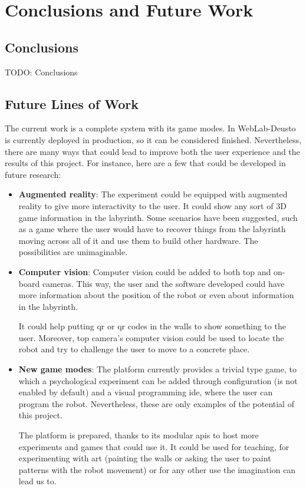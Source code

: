 \chapter{Conclusions and Future Work}

\section{Conclusions}

TODO: Conclusions

\section{Future Lines of Work}

The current work is a complete system with its game modes. In WebLab-Deusto is currently deployed in
production, so it can be considered finished. Nevertheless, there are many ways that could lead to
improve both the user experience and the results of this project. For instance, here are a few that
could be developed in future research:

\begin{itemize}

\item \textbf{Augmented reality}: The experiment could be equipped with augmented reality to give
more interactivity to the user. It could show any sort of 3D game information in the labyrinth. Some
scenarios have been suggested, such as a game where the user would have to recover things from the
labyrinth moving across all of it and use them to build other hardware. The possibilities are
unimaginable.

\item \textbf{Computer vision}: Computer vision could be added to both top and on-board cameras.
This way, the user and the software developed could have more information about the position of the
robot or even about information in the labyrinth.

It could help putting \acrshort{qr} or
\acrlong{qr} codes in the walls to show something to the user. Moreover, top camera's computer
vision could be used to locate the robot and try to challenge the user to move to a concrete place.

\item \textbf{New game modes}: The platform currently provides a trivial type game, to which a
psychological experiment can be added through configuration (is not enabled by default) and a visual
programming \acrshort{ide}, where the user can program the robot. Nevertheless, these are only
examples of the potential of this project.

The platform is prepared, thanks to its modular \acrshort{api}s to host more experiments and games
that could use it. It could be used for teaching, for experimenting with art (painting the walls or
asking the user to paint patterns with the robot movement) or for any other use the imagination can
lead us to.

\end{itemize}

